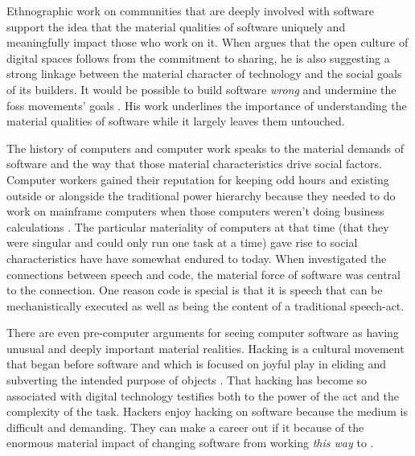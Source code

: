 \documentclass[a4paper,man,natbib]{apa6}
\begin{document}
  Ethnographic work on communities that are deeply involved with software support the idea that the material qualities of software uniquely and meaningfully impact those who work on it. When \citet{Kelty2008-jm} argues that the open culture of digital spaces follows from the commitment to sharing, he is also suggesting a strong linkage between the material character of technology and the social goals of its builders. It would be possible to build software \textit{wrong} and undermine the \gls{foss} movements' goals \citep{Kelty2008-jm}. His work underlines the importance of understanding the material qualities of software while it largely leaves them untouched.

  The history of computers and computer work speaks to the material demands of software and the way that those material characteristics drive social factors. Computer workers gained their reputation for keeping odd hours and existing outside or alongside the traditional power hierarchy because they needed to do work on mainframe computers when those computers weren't doing business calculations \citep{Ensmenger2012-kz}. The particular materiality of computers at that time (that they were singular and could only run one task at a time) gave rise to social characteristics have have somewhat endured to today. When \citet{Cox2013-zo} investigated the connections between speech and code, the material force of software was central to the connection. One reason code is special is that it is speech that can be mechanistically executed as well as being the content of a traditional speech-act. 

  There are even pre-computer arguments for seeing computer software as having unusual and deeply important material realities. Hacking is a cultural movement that began before software and which is focused on joyful play in eliding and subverting the intended purpose of objects \citep{Drexler2019-ja,Gabriella_Coleman2012-lq}. That hacking has become so associated with digital technology testifies both to the power of the act and the complexity of the task. Hackers enjoy hacking on software because the medium is difficult and demanding. They can make a career out if it because of the enormous material impact of changing software from working \textit{this way} to .
\end{document}
